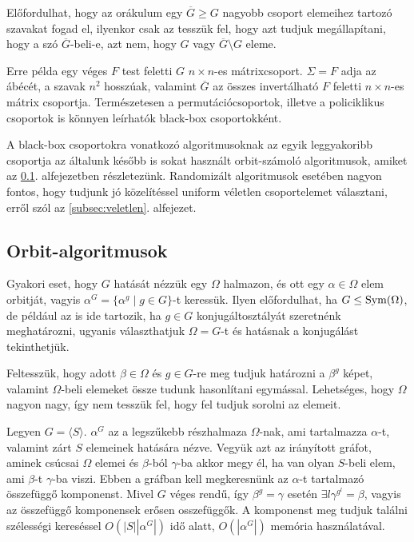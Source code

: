 Előfordulhat, hogy az orákulum egy $\overline{G} \ge G$ nagyobb csoport elemeihez tartozó szavakat fogad el,
ilyenkor csak az tesszük fel, hogy azt tudjuk megállapítani, hogy a szó $\overline{G}$-beli-e,
azt nem, hogy $G$ vagy $\overline{G}\setminus G$ eleme.

Erre példa egy véges $F$ test feletti $G$ $n\times n$-es mátrixcsoport.
$\Sigma=F$ adja az ábécét, a szavak $n^2$ hosszúak,
valamint $\overline{G}$ az összes invertálható $F$ feletti $n\times n$-es mátrix csoportja.
Természetesen a permutációcsoportok, illetve a policiklikus csoportok is könnyen leírhatók black-box csoportokként.

A black-box csoportokra vonatkozó algoritmusoknak az egyik leggyakoribb csoportja az általunk később is sokat használt
orbit-számoló algoritmusok, amiket az \ref{subsec:orbit}. alfejezetben részletezünk.
Randomizált algoritmusok esetében nagyon fontos, hogy tudjunk jó közelítéssel uniform véletlen csoportelemet választani,
erről szól az \ref{subsec:veletlen}. alfejezet.

\subsection{Orbit-algoritmusok}
\label{subsec:orbit}
Gyakori eset, hogy $G$ hatását nézzük egy $\Omega$ halmazon, és ott egy $\alpha\in\Omega$ elem orbitját,
vagyis $\alpha^G = \{ \alpha^g \mid g \in G \}$-t keressük. Ilyen előfordulhat, ha $G \le \operatorname{Sym}(\Omega)$,
de például az is ide tartozik, ha $g \in G$ konjugáltosztályát szeretnénk meghatározni, ugyanis választhatjuk
$\Omega=G$-t és hatásnak a konjugálást tekinthetjük.

Feltesszük, hogy adott $\beta\in\Omega$ és $g\in G$-re meg tudjuk határozni a $\beta^g$ képet, valamint $\Omega$-beli
elemeket össze tudunk hasonlítani egymással. Lehetséges, hogy $\Omega$ nagyon nagy, így nem tesszük fel, hogy fel tudjuk sorolni az elemeit.

Legyen $G=\langle S\rangle$. $\alpha^G$ az a legszűkebb részhalmaza $\Omega$-nak, ami tartalmazza $\alpha$-t, valamint zárt $S$ elemeinek hatására nézve.
Vegyük azt az irányított gráfot, aminek csúcsai $\Omega$ elemei és $\beta$-ból $\gamma$-ba akkor megy él, ha van olyan $S$-beli elem, ami $\beta$-t $\gamma$-ba viszi.
Ebben a gráfban kell megkeresnünk az $\alpha$-t tartalmazó összefüggő komponenst.
Mivel $G$ véges rendű, így $\beta^g=\gamma$ esetén $\exists l \gamma^{g^l}=\beta$, vagyis az összefüggő komponensek erősen osszefüggők.
A komponenst meg tudjuk találni szélességi kereséssel $O(|S| |\alpha^G|)$ idő alatt, $O(|\alpha^G|)$ memória használatával.

